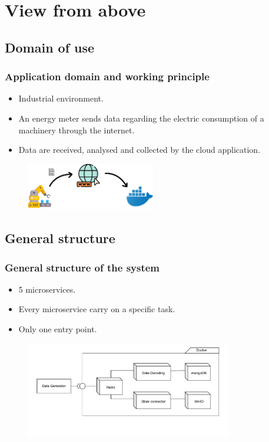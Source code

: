 \section{View from above}

\subsection{Domain of use}
\begin{frame}
	\frametitle{Application domain and working principle}
	
	\begin{itemize}
		\item Industrial environment.\\
		\item An energy meter sends data regarding the electric consumption of a machinery through the internet.\\
		\item Data are received, analysed and collected by the cloud application.
	\end{itemize}
	
	\bigskip
	\begin{figure}[h]
		\centering
		\includegraphics[width=0.5\textwidth]{./img/general_domain.png}
	\end{figure}
\end{frame}


\subsection{General structure}
\begin{frame}
	\frametitle{General structure of the system}
	
	\begin{itemize}
		\item 5 microservices.
		\item Every microservice carry on a specific task.
		\item Only one entry point.
	\end{itemize}
	
	\begin{figure}[h]
		\centering
		\includegraphics[width=0.8\textwidth]{./drawings/general_scheme.pdf}
	\end{figure}
\end{frame}


